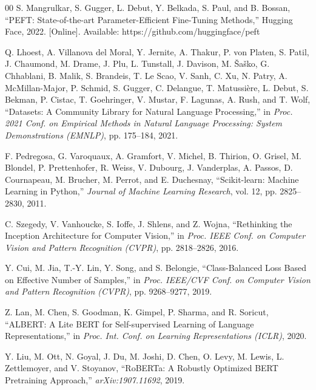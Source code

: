 \documentclass[conference]{IEEEtran}
\begin{document}
\begin{thebibliography}{00}
 S. Mangrulkar, S. Gugger, L. Debut, Y. Belkada, S. Paul, and B. Bossan, ``PEFT: State-of-the-art Parameter-Efficient Fine-Tuning Methods,'' Hugging Face, 2022. [Online]. Available: https://github.com/huggingface/peft

 Q. Lhoest, A. Villanova del Moral, Y. Jernite, A. Thakur, P. von Platen, S. Patil, J. Chaumond, M. Drame, J. Plu, L. Tunstall, J. Davison, M. \v{S}a\v{s}ko, G. Chhablani, B. Malik, S. Brandeis, T. Le Scao, V. Sanh, C. Xu, N. Patry, A. McMillan-Major, P. Schmid, S. Gugger, C. Delangue, T. Matussi\`ere, L. Debut, S. Bekman, P. Cistac, T. Goehringer, V. Mustar, F. Lagunas, A. Rush, and T. Wolf, ``Datasets: A Community Library for Natural Language Processing,'' in \textit{Proc. 2021 Conf. on Empirical Methods in Natural Language Processing: System Demonstrations (EMNLP)}, pp. 175--184, 2021.

 F. Pedregosa, G. Varoquaux, A. Gramfort, V. Michel, B. Thirion, O. Grisel, M. Blondel, P. Prettenhofer, R. Weiss, V. Dubourg, J. Vanderplas, A. Passos, D. Cournapeau, M. Brucher, M. Perrot, and E. Duchesnay, ``Scikit-learn: Machine Learning in Python,'' \textit{Journal of Machine Learning Research}, vol. 12, pp. 2825--2830, 2011.

 C. Szegedy, V. Vanhoucke, S. Ioffe, J. Shlens, and Z. Wojna, ``Rethinking the Inception Architecture for Computer Vision,'' in \textit{Proc. IEEE Conf. on Computer Vision and Pattern Recognition (CVPR)}, pp. 2818--2826, 2016.

 Y. Cui, M. Jia, T.-Y. Lin, Y. Song, and S. Belongie, ``Class-Balanced Loss Based on Effective Number of Samples,'' in \textit{Proc. IEEE/CVF Conf. on Computer Vision and Pattern Recognition (CVPR)}, pp. 9268--9277, 2019.

 Z. Lan, M. Chen, S. Goodman, K. Gimpel, P. Sharma, and R. Soricut, ``ALBERT: A Lite BERT for Self-supervised Learning of Language Representations,'' in \textit{Proc. Int. Conf. on Learning Representations (ICLR)}, 2020.

 Y. Liu, M. Ott, N. Goyal, J. Du, M. Joshi, D. Chen, O. Levy, M. Lewis, L. Zettlemoyer, and V. Stoyanov, ``RoBERTa: A Robustly Optimized BERT Pretraining Approach,'' \textit{arXiv:1907.11692}, 2019.

\end{thebibliography}
\end{document}
